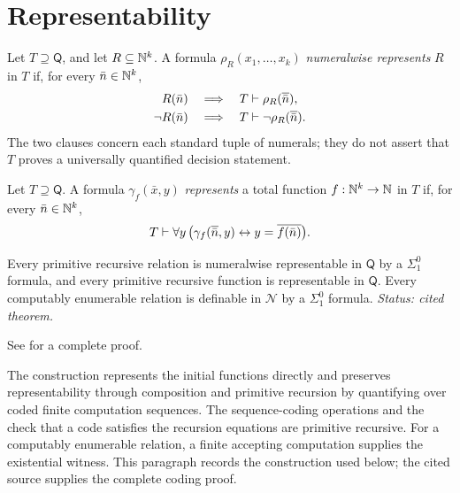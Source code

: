 \section{Representability}
\label{sec:arithmetic-coding-03}

\begin{definition}
Let \(T\supseteq\mathsf Q\), and let \(R\subseteq\mathbb{N}^k\).  A formula
\(\rho_R(x_1,\ldots,x_k)\) \emph{numeralwise represents} \(R\) in \(T\) if,
for every \(\bar n\in\mathbb{N}^k\),
\[
\begin{aligned}
  R(\bar n)&\quad\Longrightarrow\quad
  T\vdash\rho_R(\overline{\bar n}),\\
  \neg R(\bar n)&\quad\Longrightarrow\quad
  T\vdash\neg\rho_R(\overline{\bar n}).
\end{aligned}
\]
The two clauses concern each standard tuple of numerals; they do not assert
that \(T\) proves a universally quantified decision statement.
\end{definition}

\begin{definition}
Let \(T\supseteq\mathsf Q\).  A formula \(\gamma_f(\bar x,y)\)
\emph{represents} a total function
\(f:\mathbb{N}^k\to\mathbb{N}\) in \(T\) if, for every \(\bar n\in\mathbb{N}^k\),
\[
  T\vdash\forall y\,
  \bigl(\gamma_f(\overline{\bar n},y)
  \leftrightarrow y=\overline{f(\bar n)}\bigr).
\]
\end{definition}

\begin{theorem}
\label{thm:representability}
Every primitive recursive relation is numeralwise representable in
\(\mathsf Q\) by a \(\Sigma^0_1\) formula, and every primitive recursive
function is representable in \(\mathsf Q\).  Every computably enumerable
relation is definable in \(\mathcal N\) by a \(\Sigma^0_1\) formula.
\textit{Status: cited theorem.}
\end{theorem}

See \cite{Shoenfield1967} for a complete proof.

The construction represents the initial functions directly and preserves
representability through composition and primitive recursion by quantifying
over coded finite computation sequences.  The sequence-coding operations and
the check that a code satisfies the recursion equations are primitive
recursive.  For a computably enumerable relation, a finite accepting
computation supplies the existential witness.  This paragraph records the
construction used below; the cited source supplies the complete coding proof.

